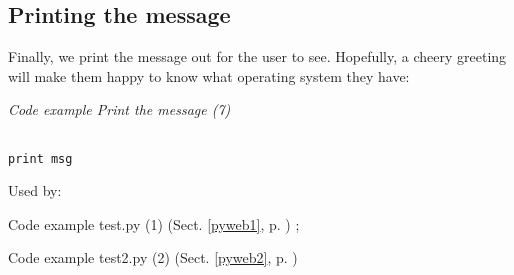 \documentclass{article}
\begin{document}
\subsection{Printing the message}

Finally, we print the message out for the user to see.  Hopefully, a
cheery greeting will make them happy to know what operating system
they have:

\label{pyweb7}
    \begin{flushleft}
    \textit{Code example Print the message (7)}
    \begin{Verbatim}[commandchars=\\\{\},codes={\catcode`$=3\catcode`^=7},frame=single]

print msg

    \end{Verbatim}
    
    \footnotesize
    Used by:
    \begin{list}{}{}
    
    \item Code example test.py (1) (Sect. \ref{pyweb1}, p. \pageref{pyweb1})
; 
    \item Code example test2.py (2) (Sect. \ref{pyweb2}, p. \pageref{pyweb2})

    \end{list}
    \normalsize
    
    \end{flushleft}
\end{document}
